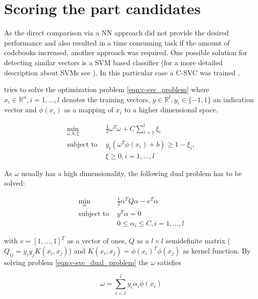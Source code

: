 \section{Scoring the part candidates}


As the direct comparison via a \ac{NN} approach did not provide the desired performance and also resulted in a time consuming task if the amount of codebooks increased, another approach was required. One possible solution for detecting similar vectors is a \ac{SVM} based classifier (for a more detailed description about \acp{SVM} see ). In this particular case a \ac{C-SVC} was trained \cite{Chang:2011:LLS:1961189.1961199} \cite{boser1992training} \cite{cortes1995support}.

 tries to solve the optimization problem \ref{eqn:c-svc_problem} where $x_i \in \mathbb{R}^n, i = 1, \dots, l$ denotes the training vectors, $y \in \mathbb{R}^l, y_i \in \{-1, 1\}$ an indication vector and $\phi(x_i)$ as a mapping of $x_i$ to a higher dimensional space.

\begin{align}
\min_{\omega, b, \xi} &\frac{1}{2} \omega^T \omega + C \sum_{i=1}^{l} \xi_i 
    \label{eqn:c-svc_problem} \\
\text{subject to } &y_i(\omega^T \phi(x_i) + b) \ge 1 - \xi_i, \nonumber \\
                   &\xi \ge 0, i = 1, \dots, l \nonumber
\end{align}

As $\omega$ usually has a high dimensionality, the following dual problem has to be solved:

\begin{align}
\min_\alpha & \frac{1}{2} \alpha^T Q \alpha - e^T \alpha 
    \label{eqn:c-svc_dual_problem} \\
\text{subject to } & y^T \alpha = 0 \nonumber \\
                   & 0 \le \alpha_i \le C, i = 1, \dots, l \nonumber
\end{align}

with $e = [1, \dots, 1]^T$ as a vector of ones, $Q$ as a $l \times l$ semidefinite matrix ($Q_{ij} = y_i y_j K(x_i, x_j)$) and $K(x_i, x_j) = \phi(x_i)^T \phi(x_j)$ as kernel function.
By solving problem \ref{eqn:c-svc_dual_problem} the $\omega$ satisfies 

\begin{equation}
\omega = \sum_{i=1}^{l} y_i \alpha_i \phi(x_i)
\end{equation}

